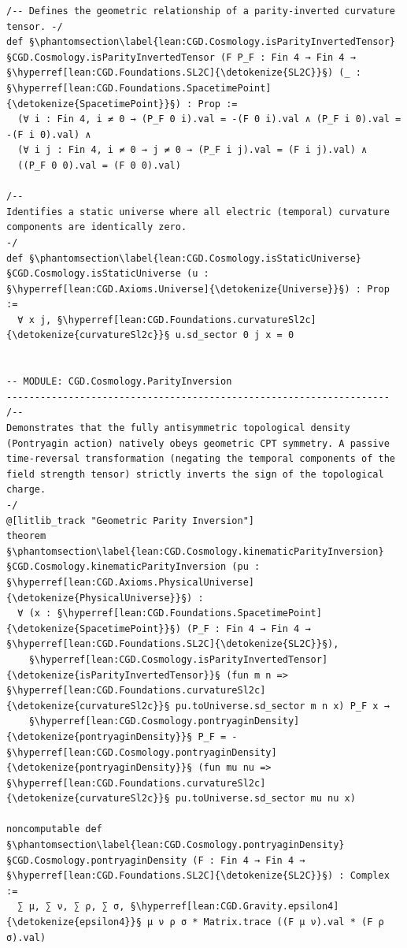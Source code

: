 \begin{verbatim}
/-- Defines the geometric relationship of a parity-inverted curvature tensor. -/
def §\phantomsection\label{lean:CGD.Cosmology.isParityInvertedTensor}§CGD.Cosmology.isParityInvertedTensor (F P_F : Fin 4 → Fin 4 → §\hyperref[lean:CGD.Foundations.SL2C]{\detokenize{SL2C}}§) (_ : §\hyperref[lean:CGD.Foundations.SpacetimePoint]{\detokenize{SpacetimePoint}}§) : Prop :=
  (∀ i : Fin 4, i ≠ 0 → (P_F 0 i).val = -(F 0 i).val ∧ (P_F i 0).val = -(F i 0).val) ∧
  (∀ i j : Fin 4, i ≠ 0 → j ≠ 0 → (P_F i j).val = (F i j).val) ∧
  ((P_F 0 0).val = (F 0 0).val)

/--
Identifies a static universe where all electric (temporal) curvature components are identically zero.
-/
def §\phantomsection\label{lean:CGD.Cosmology.isStaticUniverse}§CGD.Cosmology.isStaticUniverse (u : §\hyperref[lean:CGD.Axioms.Universe]{\detokenize{Universe}}§) : Prop :=
  ∀ x j, §\hyperref[lean:CGD.Foundations.curvatureSl2c]{\detokenize{curvatureSl2c}}§ u.sd_sector 0 j x = 0


-- MODULE: CGD.Cosmology.ParityInversion
--------------------------------------------------------------------
/--
Demonstrates that the fully antisymmetric topological density (Pontryagin action) natively obeys geometric CPT symmetry. A passive time-reversal transformation (negating the temporal components of the field strength tensor) strictly inverts the sign of the topological charge.
-/
@[litlib_track "Geometric Parity Inversion"]
theorem §\phantomsection\label{lean:CGD.Cosmology.kinematicParityInversion}§CGD.Cosmology.kinematicParityInversion (pu : §\hyperref[lean:CGD.Axioms.PhysicalUniverse]{\detokenize{PhysicalUniverse}}§) :
  ∀ (x : §\hyperref[lean:CGD.Foundations.SpacetimePoint]{\detokenize{SpacetimePoint}}§) (P_F : Fin 4 → Fin 4 → §\hyperref[lean:CGD.Foundations.SL2C]{\detokenize{SL2C}}§),
    §\hyperref[lean:CGD.Cosmology.isParityInvertedTensor]{\detokenize{isParityInvertedTensor}}§ (fun m n => §\hyperref[lean:CGD.Foundations.curvatureSl2c]{\detokenize{curvatureSl2c}}§ pu.toUniverse.sd_sector m n x) P_F x →
    §\hyperref[lean:CGD.Cosmology.pontryaginDensity]{\detokenize{pontryaginDensity}}§ P_F = - §\hyperref[lean:CGD.Cosmology.pontryaginDensity]{\detokenize{pontryaginDensity}}§ (fun mu nu => §\hyperref[lean:CGD.Foundations.curvatureSl2c]{\detokenize{curvatureSl2c}}§ pu.toUniverse.sd_sector mu nu x)

noncomputable def §\phantomsection\label{lean:CGD.Cosmology.pontryaginDensity}§CGD.Cosmology.pontryaginDensity (F : Fin 4 → Fin 4 → §\hyperref[lean:CGD.Foundations.SL2C]{\detokenize{SL2C}}§) : Complex :=
  ∑ μ, ∑ ν, ∑ ρ, ∑ σ, §\hyperref[lean:CGD.Gravity.epsilon4]{\detokenize{epsilon4}}§ μ ν ρ σ * Matrix.trace ((F μ ν).val * (F ρ σ).val)



\end{verbatim}
